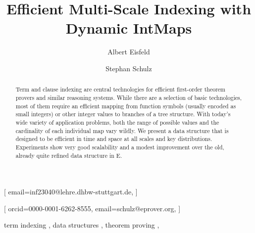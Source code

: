 \documentclass[]{ceurart}
\begin{document}


\title{Efficient Multi-Scale Indexing with Dynamic IntMaps}


\author[1]{Albert Eisfeld}[%
email=inf23040@lehre.dhbw-stuttgart.de,
]

\author[1]{Stephan Schulz}[%
orcid=0000-0001-6262-8555,
email=schulz@eprover.org,
]

\address[1]{DHBW Stuttgart, Stuttgart, Germany}
\begin{abstract}
  Term and clause indexing are central technologies for efficient
  first-order theorem provers and similar reasoning systems. While
  there are a selection of basic technologies, most of them require an
  efficient mapping from function symbols (usually encoded as small
  integers) or other integer values to branches of a tree
  structure. With today's wide variety of application problems, both
  the range of possible values and the cardinality of each individual
  map vary wildly. We present a data structure that is designed to be
  efficient in time and space at all scales and key
  distributions. Experiments show very good scalability and a modest
  improvement over the old, already quite refined data structure in E.
\end{abstract}

\begin{keywords}
  term indexing \sep
  data structures \sep
  theorem proving \sep
\end{keywords}

\maketitle
\end{document}
